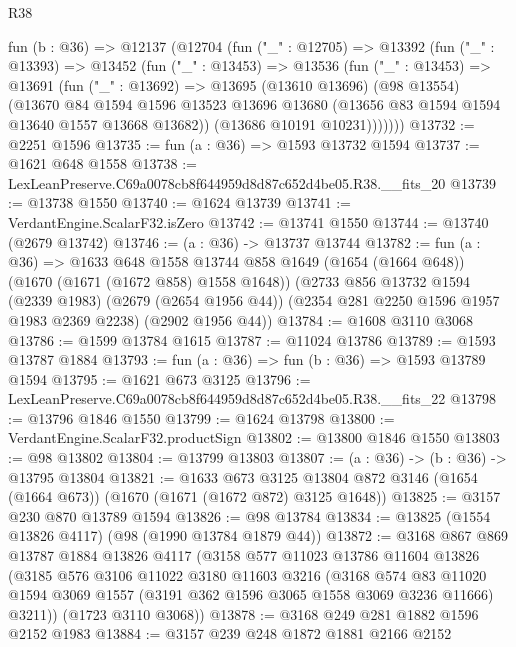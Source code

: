 \begin{lexlean}{R38}
\begin{coremodule}
  fun (b : @36) =>
  @12137
    (@12704
      (fun ("_" : @12705) =>
      @13392
        (fun ("_" : @13393) =>
        @13452
          (fun ("_" : @13453) =>
          @13536
            (fun ("_" : @13453) =>
            @13691
              (fun ("_" : @13692) =>
              @13695
                (@13610 @13696)
                (@98 @13554)
                (@13670
                  @84
                  @1594
                  @1596
                  @13523
                  @13696
                  @13680
                  (@13656 @83 @1594 @1594 @13640 @1557 @13668 @13682))
                (@13686 @10191 @10231)))))))
@13732 := @2251 @1596
@13735 := fun (a : @36) => @1593 @13732 @1594
@13737 := @1621 @648 @1558
@13738 := LexLeanPreserve.C69a0078cb8f644959d8d87c652d4be05.R38.__fits_20
@13739 := @13738 @1550
@13740 := @1624 @13739
@13741 := VerdantEngine.ScalarF32.isZero
@13742 := @13741 @1550
@13744 := @13740 (@2679 @13742)
@13746 := (a : @36) -> @13737 @13744
@13782 := fun (a : @36) =>
  @1633
    @648
    @1558
    @13744
    @858
    @1649
    (@1654 (@1664 @648))
    (@1670 (@1671 (@1672 @858) @1558 @1648))
    (@2733
      @856
      @13732
      @1594
      (@2339 @1983)
      (@2679 (@2654 @1956 @44))
      (@2354 @281 @2250 @1596 @1957 @1983 @2369 @2238)
      (@2902 @1956 @44))
@13784 := @1608 @3110 @3068
@13786 := @1599 @13784 @1615
@13787 := @11024 @13786
@13789 := @1593 @13787 @1884
@13793 := fun (a : @36) => fun (b : @36) => @1593 @13789 @1594
@13795 := @1621 @673 @3125
@13796 := LexLeanPreserve.C69a0078cb8f644959d8d87c652d4be05.R38.__fits_22
@13798 := @13796 @1846 @1550
@13799 := @1624 @13798
@13800 := VerdantEngine.ScalarF32.productSign
@13802 := @13800 @1846 @1550
@13803 := @98 @13802
@13804 := @13799 @13803
@13807 := (a : @36) -> (b : @36) -> @13795 @13804
@13821 := @1633
    @673
    @3125
    @13804
    @872
    @3146
    (@1654 (@1664 @673))
    (@1670 (@1671 (@1672 @872) @3125 @1648))
@13825 := @3157 @230 @870 @13789 @1594
@13826 := @98 @13784
@13834 := @13825 (@1554 @13826 @4117) (@98 (@1990 @13784 @1879 @44))
@13872 := @3168
    @867
    @869
    @13787
    @1884
    @13826
    @4117
    (@3158
      @577
      @11023
      @13786
      @11604
      @13826
      (@3185
        @576
        @3106
        @11022
        @3180
        @11603
        @3216
        (@3168
          @574
          @83
          @11020
          @1594
          @3069
          @1557
          (@3191 @362 @1596 @3065 @1558 @3069 @3236 @11666)
          @3211))
      (@1723 @3110 @3068))
@13878 := @3168 @249 @281 @1882 @1596 @2152 @1983
@13884 := @3157 @239 @248 @1872 @1881 @2166 @2152

\end{coremodule}
\end{lexlean}
